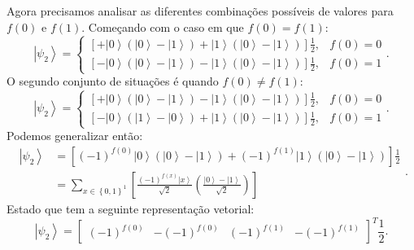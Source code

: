 Agora precisamos analisar as diferentes combinações possíveis de valores para $f\left(0\right)$  e $f\left(1\right)$. Começando com o caso em que $f\left(0\right)=f\left(1\right)$:
\begin{equation}
\left|\psi_{2}\right\rangle =\left\{ \begin{array}{cc}
\left[+\left|0\right\rangle \left(\left|0\right\rangle -\left|1\right\rangle \right)+\left|1\right\rangle \left(\left|0\right\rangle -\left|1\right\rangle \right)\right]\frac{1}{2}, & f\left(0\right)=0\\
\left[-\left|0\right\rangle \left(\left|0\right\rangle -\left|1\right\rangle \right)-\left|1\right\rangle \left(\left|0\right\rangle -\left|1\right\rangle \right)\right]\frac{1}{2}, & f\left(0\right)=1
\end{array}\right.
. \end{equation}
O segundo conjunto de situações é quando $f\left(0\right)\neq f\left(1\right)$:
\begin{equation}
\left|\psi_{2}\right\rangle =\left\{ \begin{array}{cc}
\left[+\left|0\right\rangle \left(\left|0\right\rangle -\left|1\right\rangle \right)-\left|1\right\rangle \left(\left|0\right\rangle -\left|1\right\rangle \right)\right]\frac{1}{2}, & f\left(0\right)=0\\
\left[-\left|0\right\rangle \left(\left|1\right\rangle -\left|0\right\rangle \right)+\left|1\right\rangle \left(\left|0\right\rangle -\left|1\right\rangle \right)\right]\frac{1}{2}, & f\left(0\right)=1
\end{array}\right.
. \end{equation}
Podemos generalizar então:
\begin{equation}
\begin{split}
\left|\psi_{2}\right\rangle & =\left[\left(-1\right)^{f\left(0\right)}\left|0\right\rangle \left(\left|0\right\rangle -\left|1\right\rangle \right)+\left(-1\right)^{f\left(1\right)}\left|1\right\rangle \left(\left|0\right\rangle -\left|1\right\rangle \right)\right]\frac{1}{2} \\
 & = \sum_{x\in\left\{ 0,1\right\} ^{1}}\left[\frac{\left(-1\right)^{f\left(x\right)}\left|x\right\rangle }{\sqrt{2}}\left(\frac{\left|0\right\rangle -\left|1\right\rangle }{\sqrt{2}}\right)\right]
\end{split}
\label{anterior1}
. \end{equation}
Estado que tem a seguinte representação vetorial:
\begin{equation}
\left|\psi_{2}\right\rangle =\left[\begin{array}{cccc}
\left(-1\right)^{f\left(0\right)} & -\left(-1\right)^{f\left(0\right)} & \left(-1\right)^{f\left(1\right)} & -\left(-1\right)^{f\left(1\right)}\end{array}\right]^{T}\frac{1}{2}
. \end{equation}
